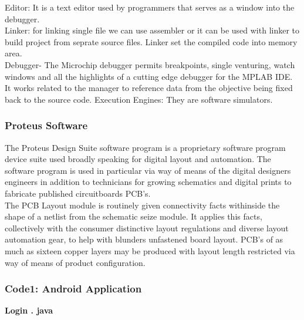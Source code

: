 \documentclass[12pt,a4paper]{article}
\begin{document}
Editor: 
It is a text editor used by programmers that serves as a window into the debugger.\\
Linker: 
for linking single file we can use assembler or it can be used with linker to build project from seprate source files. Linker set the compiled code into memory area.\\
Debugger-
 The Microchip debugger permits breakpoints, single venturing, watch windows and all the highlights of a cutting edge debugger for the MPLAB IDE. It works related to the manager to reference data from the objective being fixed back to the source code.
Execution Engines: 
They are software simulators.\\

\subsubsection{Proteus Software}
\hspace{0.5cm}The Proteus Design Suite software program is a proprietary software program device suite used broadly speaking for digital layout and automation. The software program is used in particular via way of means of the digital designers engineers
in addition to technicians for growing schematics and digital prints to fabricate published circuitboards PCB’s.\\

The PCB Layout module is routinely given connectivity facts withinside the shape of a
netlist from the schematic seize module. It applies this facts, collectively with the consumer
distinctive layout regulations and diverse layout automation gear, to help with blunders unfastened board layout.
PCB’s of as much as sixteen copper layers may be produced with layout length restricted via way of means of product configuration.\\


\subsubsection{Code1: Android Application}
\textbf{\large{Login . java}}\\ 
\end{document}
